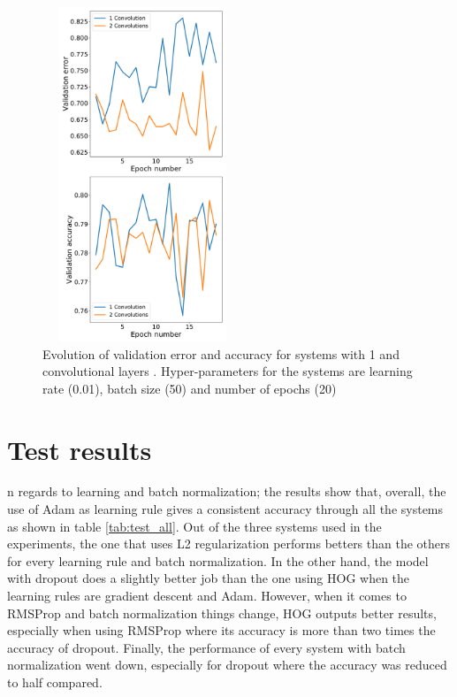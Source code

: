 \documentclass{article}
\begin{document}
\begin{figure}[tb]
\vskip 5mm
\begin{center}
\includegraphics[width=6cm,height=10cm]{expa_metrics}
\caption{Evolution of validation error and accuracy for systems with 1 and convolutional layers . Hyper-parameters for the systems are learning rate (0.01), batch size (50) and number of epochs (20)}
\label{fig:fg_cnn}
\end{center}
\vskip -5mm
\end{figure}

\section{Test results}

n regards to learning and batch normalization; the results show that, overall, the use of Adam as learning rule gives a consistent accuracy through all the systems as shown in table \ref{tab:test_all}. Out of the three systems used in the experiments, the one that uses L2 regularization performs betters than the others for every learning rule and batch normalization. In the other hand, the model with dropout does a slightly better job than the one using HOG when the learning rules are gradient descent and Adam. However, when it comes to RMSProp and batch normalization things change, HOG outputs better results, especially when using RMSProp where its accuracy is more than two times the accuracy of dropout. Finally, the performance of every system with batch normalization went down, especially for dropout where the accuracy was reduced to half compared.
\end{document}
